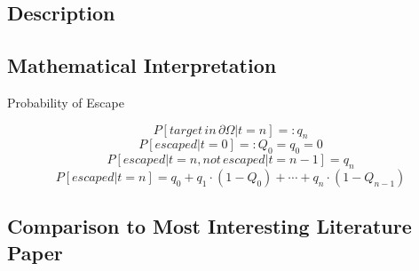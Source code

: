 \documentclass[12pt, letterpaper]{article}  %
\theoremstyle{definition}
\theoremstyle{remark}
\theoremstyle{plain}
\begin{document}
\subsection{Description}\label{subsecmeth:desc}



\subsection{Mathematical Interpretation}\label{subsecDist:math}









Probability of Escape

\[P[target\,in\,\partial\Omega|t=n]=:q_n\]
\[P[escaped|t=0]=:Q_0=q_0=0\]
\[P[escaped|t=n, not\,escaped|t=n-1]=q_n\]
\[P[escaped|t=n]=q_0+q_1\cdot(1-Q_0)+\cdots+q_n\cdot(1-Q_{n-1})\]

\subsection{Comparison to Most Interesting Literature Paper}\label{subsec:hess}

\end{document}
